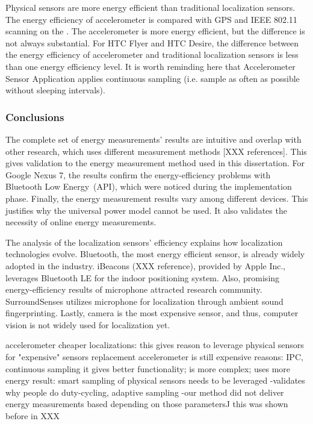 
Physical sensors are more energy efficient than traditional localization sensors. The energy efficiency of accelerometer is compared with GPS and IEEE 802.11 scanning on the . The accelerometer is more energy efficient, but the difference is not always substantial. For HTC Flyer and HTC Desire, the difference between the energy efficiency of accelerometer and traditional localization sensors is less than one energy efficiency level. It is worth reminding here that Accelerometer Sensor Application applies continuous sampling (i.e. sample as often as possible without sleeping intervals).
	


\subsubsection{Conclusions}
The complete set of energy measurements' results are intuitive and overlap with other research, which uses different measurement methods [XXX references]. This gives validation to the energy measurement method used in this dissertation. For Google Nexus 7, the results confirm the energy-efficiency problems with Bluetooth Low Energy\ (API), which were noticed during the implementation phase. Finally, the energy measurement results vary among different devices. This justifies why the universal power model cannot be used. It also validates the necessity of online energy measurements. 

The analysis of the localization sensors' efficiency explains how localization technologies evolve. Bluetooth, the most energy efficient sensor, is already widely adopted in the industry. iBeacons (XXX reference), provided by Apple Inc.,  leverages Bluetooth LE for the indoor positioning system. Also, promising energy-efficiency results of microphone attracted research community. SurroundSenses \cite{azizyan:surroundsense} utilizes microphone for localization through ambient sound fingerprinting. Lastly, camera is the most expensive sensor, and thus, computer vision is not widely used for localization yet.
		
accelerometer cheaper localizations:
	this gives reason to leverage physical sensors for "expensive" sensors replacement
	accelerometer is still expensive
		reasons: IPC, continuous sampling
			it gives better functionality; is more complex; uses more energy
		result: smart sampling of physical sensors needs to be leveraged
			-validates why people do duty-cycling, adaptive sampling
			-our method did not deliver energy measurements based depending on those parameters^^
		this was shown before in XXX
		
